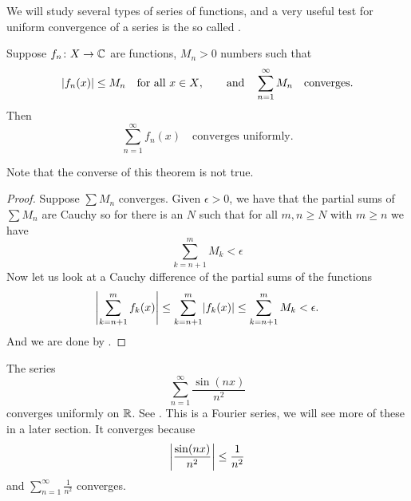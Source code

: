 We will study several types of series of functions, and
a very useful test for uniform convergence of a series is the 
so called \emph{}.

\begin{thm} \label{thm:weiermtest}
Suppose $f_n \colon X \to {\mathbb{C}}$ are functions, $M_n > 0$ numbers such
that
\begin{equation*}
\lvert {f_n(x)} \rvert\leq M_n \quad \text{for all $x \in X$},
\qquad \text{and} \quad
\sum_{n=1}^\infty M_n
\quad \text{converges}.
\end{equation*}
Then
\begin{equation*}
\sum_{n=1}^\infty f_n(x)
\quad \text{converges uniformly}.
\end{equation*}
\end{thm}

Note that the converse of this theorem is not true.

\begin{proof}
Suppose $\sum M_n$ converges.  Given $\epsilon > 0$,
we have that the partial sums of $\sum M_n$ are Cauchy so for
there is an $N$ such that for all $m, n \geq N$ with $m \geq n$ we have
\begin{equation*}
\sum_{k=n+1}^m M_k < \epsilon
\end{equation*}
Now let us look at a Cauchy difference of the partial
sums of the functions
\begin{equation*}
\left\lvert {\sum_{k=n+1}^m f_k(x)} \right\rvert \leq
\sum_{k=n+1}^m \lvert {f_k(x)} \rvert \leq
\sum_{k=n+1}^m M_k < \epsilon .
\end{equation*}
And we are done by .
\end{proof}

\begin{example}
The series
\begin{equation*}
\sum_{n=1}^\infty \frac{\sin(nx)}{n^2}
\end{equation*}
converges uniformly on ${\mathbb{R}}$.  See .
This is a Fourier series,
we will see more of these in a later section.  It converges because
\begin{equation*}
\left\lvert {\frac{\sin(nx)}{n^2}} \right\rvert \leq 
\frac{1}{n^2}
\end{equation*}
and
$\sum_{n=1}^\infty \frac{1}{n^2}$
converges.
\end{example}

